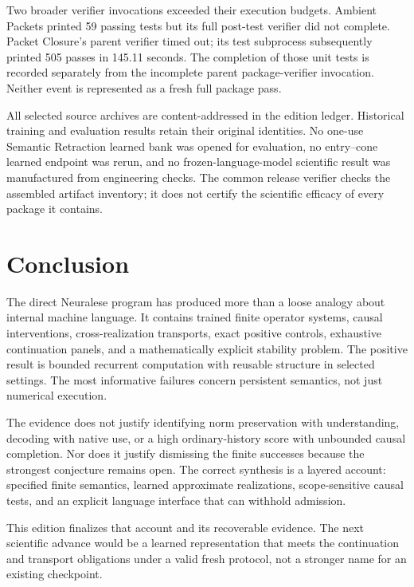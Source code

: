 \documentclass[11pt]{article}
\begin{document}
Two broader verifier invocations exceeded their execution budgets. Ambient Packets printed 59 passing tests but its full post-test verifier did not complete. Packet Closure's parent verifier timed out; its test subprocess subsequently printed 505 passes in 145.11 seconds. The completion of those unit tests is recorded separately from the incomplete parent package-verifier invocation. Neither event is represented as a fresh full package pass.

All selected source archives are content-addressed in the edition ledger. Historical training and evaluation results retain their original identities. No one-use Semantic Retraction learned bank was opened for evaluation, no entry--cone learned endpoint was rerun, and no frozen-language-model scientific result was manufactured from engineering checks. The common release verifier checks the assembled artifact inventory; it does not certify the scientific efficacy of every package it contains.

\section{Conclusion}
The direct Neuralese program has produced more than a loose analogy about internal machine language. It contains trained finite operator systems, causal interventions, cross-realization transports, exact positive controls, exhaustive continuation panels, and a mathematically explicit stability problem. The positive result is bounded recurrent computation with reusable structure in selected settings. The most informative failures concern persistent semantics, not just numerical execution.

The evidence does not justify identifying norm preservation with understanding, decoding with native use, or a high ordinary-history score with unbounded causal completion. Nor does it justify dismissing the finite successes because the strongest conjecture remains open. The correct synthesis is a layered account: specified finite semantics, learned approximate realizations, scope-sensitive causal tests, and an explicit language interface that can withhold admission.

This edition finalizes that account and its recoverable evidence. The next scientific advance would be a learned representation that meets the continuation and transport obligations under a valid fresh protocol, not a stronger name for an existing checkpoint.

\clearpage
\appendix
\end{document}
